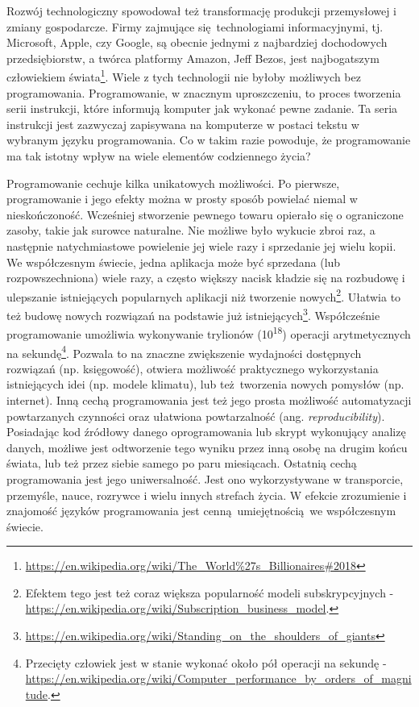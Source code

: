 \documentclass[paper=6in:9in,pagesize=pdftex,headinclude=on,footinclude=on,10pt]{scrbook}
\begin{document}
Rozwój technologiczny spowodował też transformację produkcji przemysłowej i zmiany gospodarcze.
Firmy zajmujące się~technologiami informacyjnymi, tj. Microsoft, Apple, czy Google, są obecnie jednymi z najbardziej dochodowych przedsiębiorstw, a twórca platformy Amazon, Jeff Bezos, jest najbogatszym człowiekiem świata\footnote{\url{https://en.wikipedia.org/wiki/The_World\%27s_Billionaires\#2018}}.
Wiele z tych technologii nie byłoby możliwych bez programowania.
Programowanie, w znacznym uproszczeniu, to proces tworzenia serii instrukcji, które informują komputer jak wykonać pewne zadanie.
Ta seria instrukcji jest zazwyczaj zapisywana na komputerze w postaci tekstu w wybranym języku programowania.
Co w takim razie powoduje, że programowanie ma tak istotny wpływ na wiele elementów codziennego życia?

Programowanie cechuje kilka unikatowych możliwości.
Po pierwsze, programowanie i jego efekty można w prosty sposób powielać niemal w nieskończoność.
Wcześniej stworzenie pewnego towaru opierało się o ograniczone zasoby, takie jak surowce naturalne.
Nie możliwe było wykucie zbroi raz, a następnie natychmiastowe powielenie jej wiele razy i sprzedanie jej wielu kopii.
We współczesnym świecie, jedna aplikacja może być sprzedana (lub rozpowszechniona) wiele razy, a często większy nacisk kładzie się na rozbudowę i ulepszanie istniejących popularnych aplikacji niż tworzenie nowych\footnote{Efektem tego jest też coraz większa popularność modeli subskrypcyjnych - \url{https://en.wikipedia.org/wiki/Subscription_business_model}.}.
Ułatwia to też budowę nowych rozwiązań na podstawie już istniejących\footnote{\url{https://en.wikipedia.org/wiki/Standing_on_the_shoulders_of_giants}}.
Współcześnie programowanie umożliwia wykonywanie trylionów (10\textsuperscript{18}) operacji arytmetycznych na sekundę\footnote{Przecięty człowiek jest w stanie wykonać około pół operacji na sekundę - \url{https://en.wikipedia.org/wiki/Computer_performance_by_orders_of_magnitude}.}.
Pozwala to na znaczne zwiększenie wydajności dostępnych rozwiązań (np. księgowość), otwiera możliwość praktycznego wykorzystania istniejących idei (np. modele klimatu), lub też~tworzenia nowych pomysłów (np. internet).
Inną cechą programowania jest też jego prosta możliwość automatyzacji powtarzanych czynności oraz ułatwiona powtarzalność (ang. \emph{reproducibility}).
Posiadając kod źródłowy danego oprogramowania lub skrypt wykonujący analizę danych, możliwe jest odtworzenie tego wyniku przez inną osobę na drugim końcu świata, lub też przez siebie samego po paru miesiącach.
Ostatnią cechą programowania jest jego uniwersalność.
Jest ono wykorzystywane w transporcie, przemyśle, nauce, rozrywce i wielu innych strefach życia.
W efekcie zrozumienie i znajomość języków programowania jest cenną~umiejętnością~we współczesnym świecie.
\end{document}
